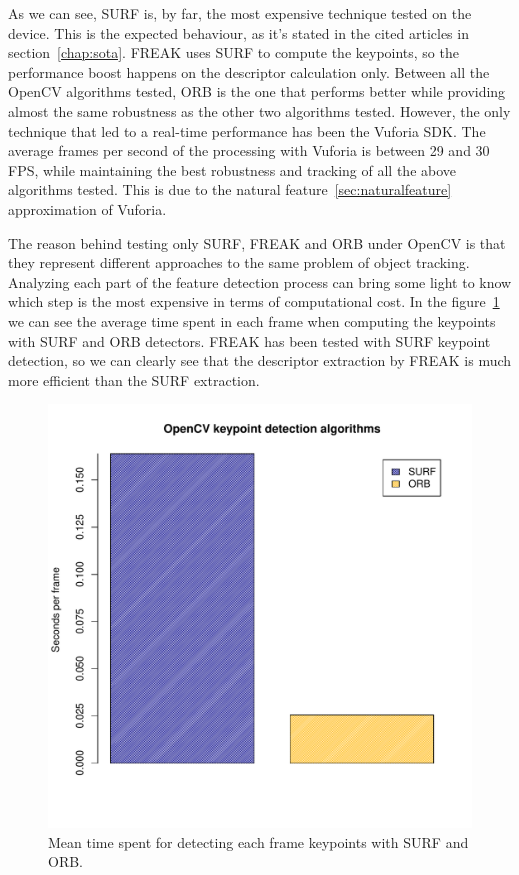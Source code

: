 As we can see, SURF is, by far, the most expensive technique tested on the device. This is the
expected behaviour, as it's stated in the cited articles in
section~\ref{chap:sota}. FREAK uses SURF to compute 
the keypoints, so the performance boost happens on the descriptor calculation
only. Between all the OpenCV algorithms tested, ORB is the one that performs better
while providing almost the same robustness as the other two algorithms tested.
However, the only technique that led to a real-time performance has been the Vuforia
SDK. The average frames per second of the processing with Vuforia is between 29 and
30 FPS, while maintaining the best robustness and tracking of all the above
algorithms tested. This is due to the natural feature~\ref{sec:naturalfeature}
approximation of Vuforia.

The reason behind testing only SURF, FREAK and ORB under OpenCV is that they
represent different approaches to the same problem of object tracking. Analyzing
each part of the feature detection process can bring some light to know which step
is the most expensive in terms of computational cost. In the
figure~\ref{fig:kpperformance} we can see the average time spent in each frame when
computing the keypoints with SURF and ORB detectors. FREAK has been tested with SURF
keypoint detection, so we can clearly see that the descriptor extraction by FREAK is
much more efficient than the SURF extraction.

\begin{figure}
\centering
\includegraphics[scale=0.75]{performance/keypoints.pdf}
\caption{\label{fig:kpperformance} Mean time spent for detecting each frame
  keypoints with SURF and ORB.}
\end{figure} 

